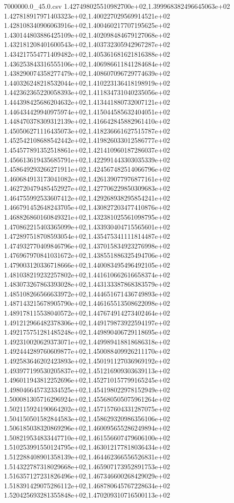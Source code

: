 \begin{filecontents*}{7000000.0_45.0.csv}
1.427498025510982700e+02,1.399968382496645063e+02
1.427818917971403323e+02,1.400227029569914521e+02
1.428108340906063916e+02,1.400460217707195625e+02
1.430144803886425109e+02,1.402098484679127068e+02
1.432181208401600543e+02,1.403732305942967287e+02
1.434217554771409482e+02,1.405361681621816388e+02
1.436253843316555106e+02,1.406986611841284684e+02
1.438290074358277479e+02,1.408607096729774639e+02
1.440326248218532044e+02,1.410223136418198919e+02
1.442362365220058393e+02,1.411834731040235056e+02
1.444398425686204632e+02,1.413441880732007121e+02
1.446434429940975974e+02,1.415044585632404051e+02
1.448470378309312139e+02,1.416642845882961410e+02
1.450506271116435073e+02,1.418236661627515787e+02
1.452542108688542442e+02,1.419826033012586777e+02
1.454577891352518861e+02,1.421410960187286037e+02
1.456613619435685791e+02,1.422991443303035339e+02
1.458649293266271911e+02,1.424567482514066796e+02
1.460684913173041082e+02,1.426139077976877161e+02
1.462720479485452927e+02,1.427706229850309683e+02
1.464755992533607412e+02,1.429268938295854241e+02
1.466791452648243705e+02,1.430827203477410876e+02
1.468826860160849321e+02,1.432381025561098795e+02
1.470862215403365099e+02,1.433930404715565601e+02
1.472897518708593054e+02,1.435475341111814487e+02
1.474932770409846796e+02,1.437015834923276998e+02
1.476967970841031672e+02,1.438551886325494706e+02
1.479003120336718666e+02,1.440083495496492105e+02
1.481038219232257802e+02,1.441610662616658374e+02
1.483073267863393028e+02,1.443133387868383579e+02
1.485108266566633972e+02,1.444651671436749893e+02
1.487143215678905790e+02,1.446165513508622098e+02
1.489178115538040572e+02,1.447674914273402464e+02
1.491212966482378306e+02,1.449179873922594197e+02
1.492175751281485248e+02,1.449890406729118695e+02
1.492310020629373071e+02,1.449989418818686318e+02
1.492444289760609877e+02,1.450088409926211170e+02
1.492583646202423893e+02,1.450191127036969192e+02
1.493977199530205837e+02,1.451216909303639113e+02
1.496011943812252696e+02,1.452710157799165245e+02
1.498046645732334525e+02,1.454198022978152949e+02
1.500081305716296924e+02,1.455680505075961264e+02
1.502115924190664202e+02,1.457157604331287075e+02
1.504150501582844583e+02,1.458629320986356106e+02
1.506185038320869296e+02,1.460095655286249894e+02
1.508219534833447710e+02,1.461556607479606100e+02
1.510253991550124795e+02,1.463012177818036434e+02
1.512288408901358139e+02,1.464462366556526831e+02
1.514322787318029668e+02,1.465907173952891753e+02
1.516357127231826496e+02,1.467346600268429029e+02
1.518391429075286112e+02,1.468780645767228634e+02
1.520425693281355848e+02,1.470209310716500113e+02

\end{filecontents*}
